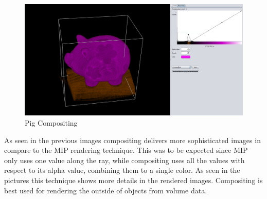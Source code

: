 \documentclass[a4paper,twoside,11pt]{article}
\begin{document}
\begin{figure}[h!]
    \includegraphics[width=\textwidth]{Images/PigCOMP.png}
    \caption{Pig Compositing}
    \label{fig:PigCOMP}
\end{figure} \newpage

As seen in the previous images compositing delivers more sophisticated images in compare to the MIP rendering technique. This was to be expected since MIP only uses one value along the ray, while compositing uses all the values with respect to its alpha value, combining them to a single color. As seen in the pictures this technique shows more details in the rendered images. \newline
Compositing is best used for rendering the outside of objects from volume data.
\newpage
\end{document}
